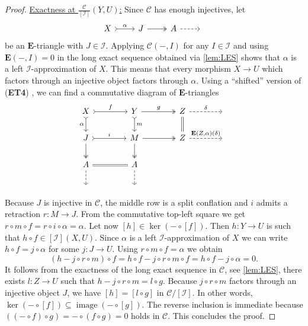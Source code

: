 \documentclass[10pt,twoside, a4paper,reqno]{amsart}
\DeclareMathOperator{\image}{image}
\newcommand{\calI}{\mathcal{I}}
\newcommand{\calC}{\mathcal{C}}
\newcommand{\E}{\mathbf{E}}
\theoremstyle{definition}
\begin{document}
\begin{proof}
	
	\underline{Exactness at $\frac{\calC}{[\calI]}(Y,U)$:} Since $\calC$ has enough injectives, let 
	\[ \begin{tikzcd}
			X \arrow[r,tail, "\alpha"] & J \arrow[r,two heads] & A \arrow[r,dashed] & {}
	\end{tikzcd} 
	\]
	be an $\E$-triangle with $J \in \calI$. Applying $\calC(-,I)$ for any $I \in \calI$ and using $\E(-,I)=0$ in the long exact sequence obtained via \cref{lem:LES} shows that $\alpha$ is a left $\calI$-approximation of $X$. This means that every morphism $X \to U$ which factors through an injective object factors through $\alpha$. Using a ``shifted'' version of (\textbf{ET4}) \cite[Lem. A.10]{GNP23}, we can find a {commutative} diagram of $\E$-triangles
		\begin{equation*}
			\begin{tikzcd}[column sep=4em]
                                  X \arrow[r,tail, "f"] \arrow[d, "\alpha", tail, swap] & Y \arrow[r,two heads, "g"] \arrow[d, tail, "m"] & Z\arrow[r,dashed, "\delta"] \arrow[d, equal] & {} \\
                                  J \arrow[r,tail, "i"] \arrow[d, two heads] & M \arrow[r,two heads] \arrow[d, two heads] & Z\arrow[r,dashed, "{\E(Z,\alpha)(\delta)}"] & {} \\
                                  A \arrow[r, equal] \arrow[d,dashed] & A \arrow[d, dashed]\\
                                  {} & {}
	\end{tikzcd}
		\end{equation*}
	Because $J$ is injective in $\calC$, the middle row is a split conflation and $i$ admits a retraction $r: M \to J$. From the commutative top-left square we get $r\circ m\circ f = r\circ i\circ \alpha = \alpha$. Let now $[h] \in \ker(- \circ {[f]})$. Then $h: Y \to U$ is such that $h \circ f \in [\calI](X,U)$. Since $\alpha$ is a left $\calI$-approximation of $X$ we can write $h \circ f = j \circ \alpha$ for some $j: J \to U$. Using $r\circ m \circ f= \alpha$ we obtain
	\[ ( h - j \circ r \circ m )\circ f = h \circ f - j \circ r \circ m \circ f = h \circ f - j \circ \alpha = 0. \]
	It follows from the exactness of the long exact sequence in $\calC$, see \cref{lem:LES}, there exists $l: Z \to U$ such that $h-j \circ r \circ m = l \circ g$. Because $j \circ r \circ m$ factors through an injective object $J$, we have $[h] = [l \circ g]$ in $\calC/[\calI]$. In other words, $\ker( - \circ {[f]}) \subseteq \image( - \circ {[g]})$. The reverse inclusion is immediate because $((- \circ f) \circ g) = - \circ (f \circ g) = 0$ holds in $\calC$. This concludes the proof.
\end{proof}
\end{document}
